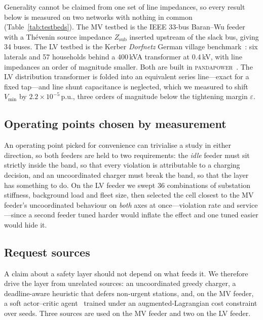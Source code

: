 \documentclass[conference,a4paper]{IEEEtran}
\begin{document}
Generality cannot be claimed from one set of line impedances, so every result
below is measured on two networks with nothing in common
(Table~\ref{tab:testbeds}). The MV testbed is the IEEE 33-bus Baran--Wu
feeder~\cite{baranwu1989} with a Th\'evenin source impedance $Z_{\mathrm{sub}}$
inserted upstream of the slack bus, giving 34 buses. The LV testbed is the Kerber
\emph{Dorfnetz} German village benchmark~\cite{kerber}: six laterals and 57
households behind a 400\,kVA transformer at 0.4\,kV, with line impedances an
order of magnitude smaller. Both are built in \textsc{pandapower}~\cite{pandapower}.
The LV distribution transformer is folded into an equivalent series line---exact
for a fixed tap---and line shunt capacitance is neglected, which we measured to
shift $V_{\min}$ by $2.2 \times 10^{-5}$\,p.u., three orders of magnitude below
the tightening margin $\varepsilon$.

\begin{table}[!t]
\caption{The Two Testbeds. Nothing Is Shared.}
\label{tab:testbeds}
\centering\small\setlength{\tabcolsep}{3.5pt}

\end{table}

\subsection{Operating points chosen by measurement}

An operating point picked for convenience can trivialise a study in either
direction, so both feeders are held to two requirements: the \emph{idle} feeder
must sit strictly inside the band, so that every violation is attributable to a
charging decision, and an uncoordinated charger must break the band, so that the
layer has something to do. On the LV feeder we swept 36 combinations of
substation stiffness, background load and fleet size, then selected the cell
closest to the MV feeder's uncoordinated behaviour on \emph{both} axes at
once---violation rate and service---since a second feeder tuned harder would
inflate the effect and one tuned easier would hide it.

\subsection{Request sources}

A claim about a safety layer should not depend on what feeds it. We therefore
drive the layer from unrelated sources: an uncoordinated greedy charger, a
deadline-aware heuristic that defers non-urgent stations, and, on the MV feeder,
a soft actor--critic agent~\cite{sac} trained under an augmented-Lagrangian cost
constraint over \nLearnedSeeds{} seeds. Three sources are used on the MV feeder
and two on the LV feeder.
\end{document}
